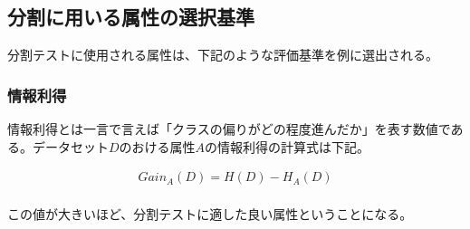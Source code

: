 \documentclass[dvipdfmx]{jsarticle}
\begin{document}
\subsection{分割に用いる属性の選択基準}
分割テストに使用される属性は、下記のような評価基準を例に選出される。
\subsubsection{情報利得}
情報利得とは一言で言えば「クラスの偏りがどの程度進んだか」を表す数値である。データセット$D$のおける属性$A$の情報利得の計算式は下記。
\begin{center}
  \begin{align*}
    Gain_{A}(D) = H(D) - H_{A}(D) \\
  \end{align*}
\end{center}
この値が大きいほど、分割テストに適した良い属性ということになる。
\end{document}
